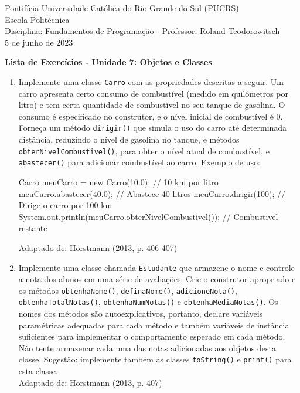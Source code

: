 \documentclass[onecolumn,a4paper,10pt]{report}
\newcommand{\+}{\, + \,}
\newcommand{\<}{\hspace*{-0.4cm}}
\begin{document}
\singlespacing

\begin{center}
Pontifícia Universidade Católica do Rio Grande do Sul (PUCRS)\\
Escola Politécnica\\
Disciplina: Fundamentos de Programação - Professor: Roland Teodorowitsch\\
5 de junho de 2023
\end{center}

\begin{center}
\textbf{Lista de Exercícios - Unidade 7: Objetos e Classes}
\end{center}

\begin{enumerate}

\item Implemente uma classe \texttt{Carro} com as propriedades descritas a seguir. Um carro apresenta certo consumo
de combustível (medido em quilômetros por litro) e tem certa quantidade de combustível no seu tanque de gasolina.
O consumo é especificado no construtor, e o nível inicial de combustível é 0. Forneça um método \texttt{dirigir()}
que simula o uso do carro até determinada distância, reduzindo o nível de gasolina no tanque, e métodos
\texttt{obterNivelCombustivel()}, para obter o nível atual de combustível, e \texttt{abastecer()} para adicionar combustível ao carro.
Exemplo de uso:\\
\begin{javacode}
Carro meuCarro = new Carro(10.0);   // 10 km por litro
meuCarro.abastecer(40.0);           // Abastece 40 litros
meuCarro.dirigir(100);              // Dirige o carro por 100 km
System.out.println(meuCarro.obterNivelCombustivel()); // Combustivel restante
\end{javacode}
{\tiny Adaptado de: Horstmann (2013, p. 406-407)}

\item Implemente uma classe chamada \texttt{Estudante} que armazene o nome e controle a nota dos alunos em uma série de avaliações. Crie o construtor apropriado e os métodos \texttt{obtenhaNome()}, \texttt{definaNome()}, \texttt{adicioneNota()}, \texttt{obtenhaTotalNotas()}, \texttt{obtenhaNumNotas()} e \texttt{obtenhaMediaNotas()}. Os nomes dos métodos são autoexplicativos, portanto, declare variáveis paramétricas adequadas para cada método e também variáveis de instância suficientes para implementar o comportamento esperado em cada método. Não tente armazenar cada uma das notas adicionadas aos objetos desta classe. Sugestão: implemente também as classes \texttt{toString()} e \texttt{print()} para esta classe.\\
{\tiny Adaptado de: Horstmann (2013, p. 407)}


\end{enumerate}
\end{document}
